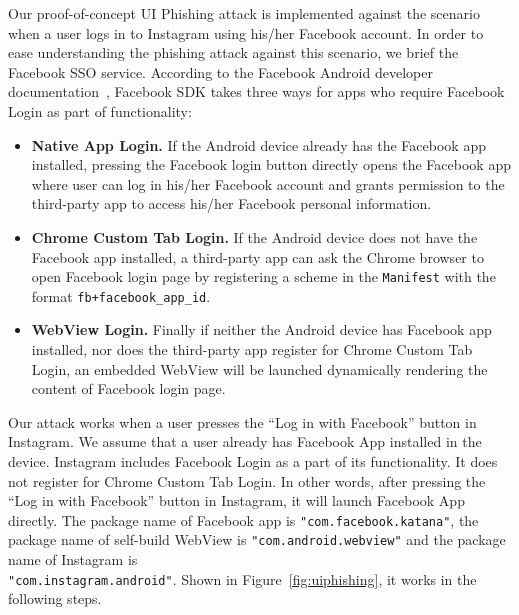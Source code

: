 \documentclass[letterpaper,12pt]{article}
\begin{document}
Our proof-of-concept UI Phishing attack is implemented against
the scenario when a user logs in to Instagram using his/her Facebook
account.  In order to ease understanding the phishing attack against
this scenario, we brief the Facebook SSO service.  According to the
Facebook Android developer documentation~\cite{FacebookLoginWays},
Facebook SDK takes three ways for apps who require Facebook Login as
part of functionality:

\begin{itemize}
\item {\bf Native App Login.}
If the Android device already has the Facebook app installed, pressing
the Facebook login button directly opens the Facebook app where user
can log in his/her Facebook account and grants permission to the
third-party app to access his/her Facebook personal information.

\item \textbf{Chrome Custom Tab Login. }
If the Android device does not have the Facebook app installed, a
third-party app can ask the Chrome browser to open Facebook login page
by registering a scheme in the \texttt{Manifest} with the format
\texttt{fb+facebook\_app\_id}.

\item {\bf WebView Login.}
Finally if neither the Android device has Facebook app installed, nor
does the third-party app register for Chrome Custom Tab Login, an
embedded WebView will be launched dynamically rendering the content of
Facebook login page.
\end{itemize}

Our attack works when a user presses the ``Log in with Facebook''
button in Instagram. We assume that a user already has Facebook App
installed in the device. Instagram includes Facebook Login as a part
of its functionality. It does not register for Chrome Custom Tab
Login. In other words, after pressing the ``Log in with Facebook''
button in Instagram, it will launch Facebook App directly. The package
name of Facebook app is \texttt{"com.facebook.katana"}, the package
name of self-build WebView is \texttt{"com.android.webview"} and the
package name of Instagram is \\
\texttt{"com.instagram.android"}.  Shown
in Figure~\ref{fig:uiphishing}, it works in the following steps.
\end{document}
